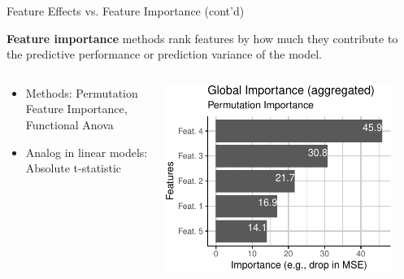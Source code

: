 \documentclass[11pt,compress,t,notes=noshow, xcolor=table]{beamer}
\begin{document}
\begin{vbframe}{Feature Effects vs. Feature Importance (cont'd)}
	
	\textbf{Feature importance} methods rank features by how much they contribute to the predictive performance or prediction variance of the model.
	\begin{columns}
		\begin{column}{0.6\textwidth}
			\begin{itemize}
				\itemsep1em
				\item Methods: Permutation Feature Importance,\\ Functional Anova
				\item Analog in linear models: Absolute t-statistic %
			\end{itemize}
		\end{column}
		\begin{column}{0.4\textwidth}
			\begin{center}
				\includegraphics[page=1, width=0.9\textwidth]{figure/feature-importance}
			\end{center}
		\end{column}
	\end{columns}
\end{vbframe}
\end{document}
